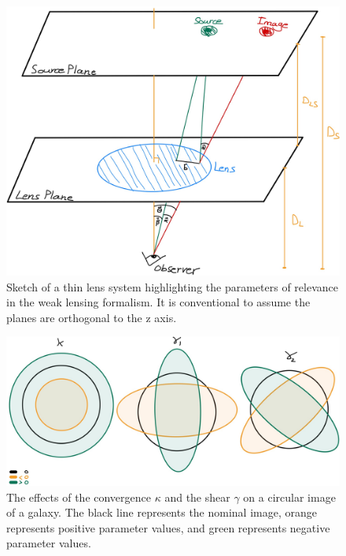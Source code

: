 \begin{figure}
    \begin{center}
      \includegraphics[width=\textwidth]{figs/lens.jpg}
    \end{center}
    \caption{Sketch of a thin lens system highlighting the parameters of relevance in the weak lensing formalism. It is conventional to assume the planes are orthogonal to the z axis.}
    \label{fig:lens}
\end{figure}

\begin{figure}
    \begin{center}
      \includegraphics[width=\textwidth]{figs/shear-11.jpg}
    \end{center}
    \caption{The effects of the convergence $\kappa$ and  the shear $\gamma$ on a circular image of a galaxy. The black line represents the nominal image, orange represents positive parameter values, and green represents negative parameter values.}
    \label{fig:shears}
\end{figure}
